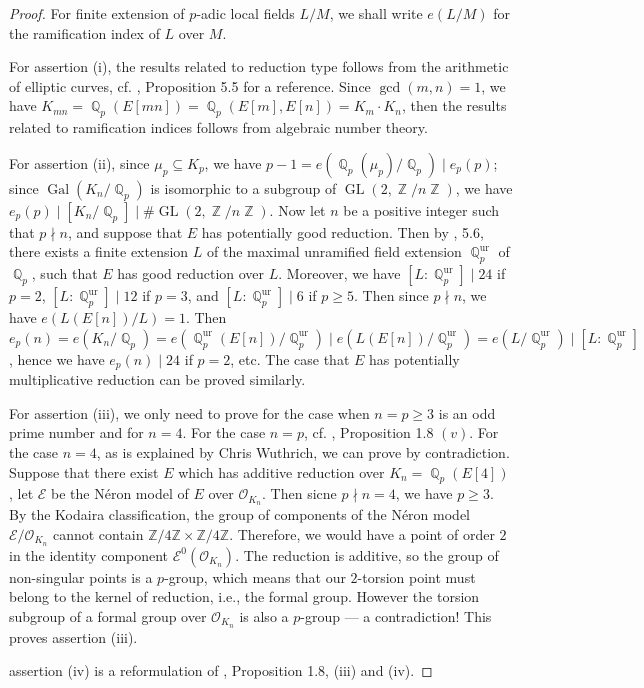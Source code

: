 \documentclass[a4paper, 12pt]{article}
\DeclareMathOperator{\Z}{\mathbb{Z}}
\DeclareMathOperator{\Q}{\mathbb{Q}}
\DeclareMathOperator{\ur}{\text{ur}}
\DeclareMathOperator{\Gal}{\text{Gal}}
\DeclareMathOperator{\GL}{\text{GL}}
\numberwithin{equation}{section}
\theoremstyle{definition}
\begin{document}
\begin{proof}
 For finite extension of $p$-adic local fields $L/M$, we shall write $e(L/M)$ for the ramification index of $L$ over $M$.

For assertion (i), the results related to reduction type follows from the arithmetic of elliptic curves, cf. \cite{Silverman2009EllipticCurves}, Proposition 5.5 for a reference. 
Since $\gcd(m,n) = 1$, we have $K_{mn} = \Q_p(E[mn]) = \Q_p(E[m], E[n]) = K_m\cdot K_n$, then the results related to ramification indices follows from algebraic number theory.

For assertion (ii), since $\mu_p \subseteq K_p$, we have $p-1 = e(\Q_p(\mu_p)/\Q_p) \mid e_p(p)$; since $\Gal(K_n/\Q_p)$ is isomorphic to a subgroup of $\GL(2,\Z/n\Z)$, we have $e_p(p) \mid [K_n/\Q_p] \mid \#\GL(2,\Z/n\Z)$. 
Now let $n$ be a positive integer such that $p\nmid n$, and suppose that $E$ has potentially good reduction.
Then by \cite{Serre1971PropritsGD}, 5.6, there exists a finite extension $L$ of the maximal unramified field extension $\Q_p^{\ur}$ of $\Q_p$, such that $E$ has good reduction over $L$. Moreover, we have $[L:\Q_p^{\ur}] \mid 24$ if $p=2$, $[L:\Q_p^{\ur}] \mid 12$ if $p=3$, and $[L:\Q_p^{\ur}] \mid 6$ if $p\ge 5$.
Then since $p\nmid n$, we have $e(L(E[n]) / L) = 1$. Then $e_p(n) = e(K_n/\Q_p) = e(\Q_p^{\ur}(E[n]) / \Q_p^{\ur} ) \mid e(L(E[n])/ \Q_p^{\ur}) = e(L/\Q_p^{\ur}) \mid [L:\Q_p^{\ur}]$, hence we have $e_p(n) \mid 24$ if $p=2$, etc. The case that $E$ has potentially multiplicative reduction can be proved similarly.

For assertion (iii), we only need to prove for the case when $n = p \ge 3$ is an odd prime number and for $n=4$. For the case $n=p$, cf. \cite{IUTchIV}, Proposition 1.8 $(v)$.
For the case $n=4$, as is explained by Chris Wuthrich, we can prove by contradiction. 
Suppose that there exist $E$ which has additive reduction over $K_n = \Q_p(E[4])$, let $\mathcal{E}$ be the N\'eron model of $E$ over $\mathcal O_{K_n}$. 
Then sicne $p\nmid n=4$, we have $p\ge 3$.
By the Kodaira classification, the group of components of the Néron model $\mathcal{E}/\mathcal{O}_{K_n}$ cannot contain $\mathbb{Z}/4\mathbb{Z}\times \mathbb{Z}/4\mathbb{Z}$. Therefore, we would have a point of order $2$ in the identity component $\mathcal{E}^0(\mathcal{O}_{K_n})$. The reduction is additive, so the group of non-singular points is a $p$-group, which means that our $2$-torsion  point must belong to the kernel of reduction, i.e.,  the formal group. However the torsion subgroup of a formal group over $\mathcal{O}_{K_n}$ is also a $p$-group --- a contradiction! This proves assertion (iii).

assertion (iv) is a reformulation of \cite{Diophantine_after_IUT_I}, Proposition 1.8, (iii) and (iv).
\end{proof}
\end{document}
